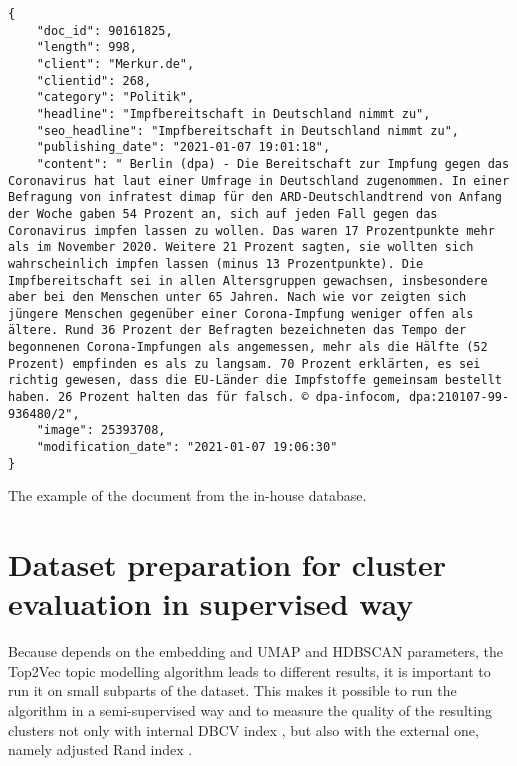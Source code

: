 \documentclass[fontsize=12pt,a4paper,twoside,openany]{scrbook}
\begin{document}
\begin{listing}[ht!]
\begin{verbatim}
{
    "doc_id": 90161825, 
    "length": 998, 
    "client": "Merkur.de", 
    "clientid": 268, 
    "category": "Politik", 
    "headline": "Impfbereitschaft in Deutschland nimmt zu", 
    "seo_headline": "Impfbereitschaft in Deutschland nimmt zu", 
    "publishing_date": "2021-01-07 19:01:18", 
    "content": " Berlin (dpa) - Die Bereitschaft zur Impfung gegen das Coronavirus hat laut einer Umfrage in Deutschland zugenommen. In einer Befragung von infratest dimap für den ARD-Deutschlandtrend von Anfang der Woche gaben 54 Prozent an, sich auf jeden Fall gegen das Coronavirus impfen lassen zu wollen. Das waren 17 Prozentpunkte mehr als im November 2020. Weitere 21 Prozent sagten, sie wollten sich wahrscheinlich impfen lassen (minus 13 Prozentpunkte). Die Impfbereitschaft sei in allen Altersgruppen gewachsen, insbesondere aber bei den Menschen unter 65 Jahren. Nach wie vor zeigten sich jüngere Menschen gegenüber einer Corona-Impfung weniger offen als ältere. Rund 36 Prozent der Befragten bezeichneten das Tempo der begonnenen Corona-Impfungen als angemessen, mehr als die Hälfte (52 Prozent) empfinden es als zu langsam. 70 Prozent erklärten, es sei richtig gewesen, dass die EU-Länder die Impfstoffe gemeinsam bestellt haben. 26 Prozent halten das für falsch. © dpa-infocom, dpa:210107-99-936480/2", 
    "image": 25393708, 
    "modification_date": "2021-01-07 19:06:30"
}

\end{verbatim}
\caption{The example of the document from the in-house database.} 
\label{listing:json-example}
\end{listing}
 
\section{Dataset preparation for cluster evaluation in supervised way}
\label{sec:exp_setup}

Because depends on the embedding and UMAP and HDBSCAN parameters, the Top2Vec topic modelling algorithm leads to different results, it is important to run it on small subparts of the dataset. This makes it possible to run the algorithm in a semi-supervised way and to measure the quality of the resulting clusters not only with internal DBCV index \parencite{Moulavi14}, but also with the external one, namely adjusted Rand index \parencite{Hubert85}. 
\end{document}

